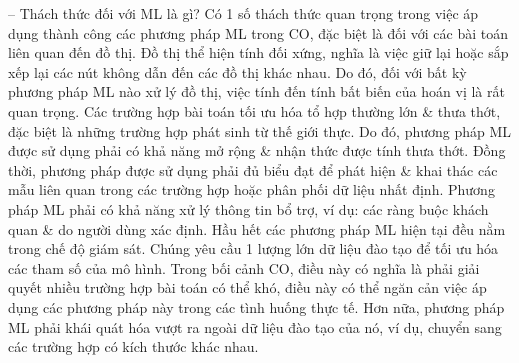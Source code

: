 \documentclass{article}
\begin{document}
\begin{itemize}
\begin{itemize}
        -- {\sf Thách thức đối với ML là gì?} Có 1 số thách thức quan trọng trong việc áp dụng thành công các phương pháp ML trong CO, đặc biệt là đối với các bài toán liên quan đến đồ thị. Đồ thị thể hiện tính đối xứng, nghĩa là việc giữ lại hoặc sắp xếp lại các nút không dẫn đến các đồ thị khác nhau. Do đó, đối với bất kỳ phương pháp ML nào xử lý đồ thị, việc tính đến tính bất biến của hoán vị là rất quan trọng. Các trường hợp bài toán tối ưu hóa tổ hợp thường lớn \& thưa thớt, đặc biệt là những trường hợp phát sinh từ thế giới thực. Do đó, phương pháp ML được sử dụng phải có khả năng mở rộng \& nhận thức được tính thưa thớt. Đồng thời, phương pháp được sử dụng phải đủ biểu đạt để phát hiện \& khai thác các mẫu liên quan trong các trường hợp hoặc phân phối dữ liệu nhất định. Phương pháp ML phải có khả năng xử lý thông tin bổ trợ, ví dụ: các ràng buộc khách quan \& do người dùng xác định. Hầu hết các phương pháp ML hiện tại đều nằm trong chế độ giám sát. Chúng yêu cầu 1 lượng lớn dữ liệu đào tạo để tối ưu hóa các tham số của mô hình. Trong bối cảnh CO, điều này có nghĩa là phải giải quyết nhiều trường hợp bài toán có thể khó, điều này có thể ngăn cản việc áp dụng các phương pháp này trong các tình huống thực tế. Hơn nữa, phương pháp ML phải khái quát hóa vượt ra ngoài dữ liệu đào tạo của nó, ví dụ, chuyển sang các trường hợp có kích thước khác nhau.


\end{itemize}
\end{itemize}
\end{document}

